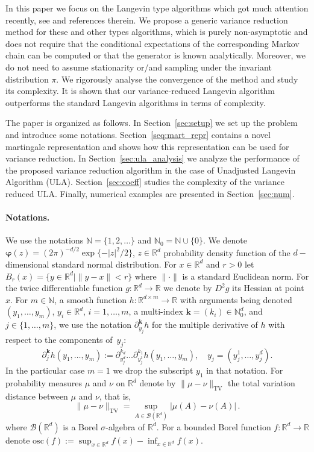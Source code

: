 \documentclass[bj]{imsart}
\def\nset{\mathbb{N}}
\def\rset{\mathbb{R}}
\def\rset{\mathbb{R}}
\newcommand{\tvnorm}[1]{\| #1 \|_{\operatorname{TV}}}
\def\eqsp{\,}
\begin{document}
\par
In this paper we focus on the  Langevin type algorithms which got much attention recently, see \cite{dalalyan2017theoretical,durmus:moulines:2017, MR2353037, MR3861816, MR2977986} and references therein. We propose  a generic variance reduction method for these and other types algorithms, which is purely non-asymptotic and does not require that    the conditional expectations of the corresponding Markov chain can be computed  or that the generator is known analytically. Moreover, we do not need to assume stationarity or/and sampling under the invariant distribution \(\pi.\) We rigorously analyse the convergence of the method and study its complexity. It is shown that  our variance-reduced Langevin algorithm outperforms the standard Langevin algorithms in terms of complexity.
\par
The paper is organized as follows.  In Section~\ref{sec:setup} we set up the problem and introduce some notations. Section~\ref{seq:mart_repr} contains a novel martingale representation and shows how this representation can be used for variance reduction. In Section~\ref{sec:ula_analysis} we analyze the performance of the proposed variance reduction algorithm in the case of Unadjusted Langevin Algorithm (ULA). Section~\ref{sec:coeff} studies the complexity of the variance reduced ULA. Finally, numerical examples are presented in Section~\ref{sec:num}.

\paragraph{Notations. }\label{par:notations}
We use the notations $\nset=\{1,2,\ldots\}$ and $\nset_0=\mathbb N\cup\{0\}$. We denote $\boldsymbol{\varphi}(z)=(2\pi)^{-d/2} \exp\{-|z|^2/2\}$, $z\in\mathbb R^d$ probability density function of the $d-$dimensional standard normal distribution. For $x \in \rset^d$ and $r>0$ let $B_r(x) = \{y \in \rset^d | \|y - x\| < r\}$ where $\|\cdot\|$ is a standard Euclidean norm. For the twice differentiable function $g: \rset^d \rightarrow \rset$ we denote by $D^2g$ its Hessian at point $x$. For $m\in\mathbb N$, a smooth function
$h\colon\mathbb R^{d\times m}\to\mathbb R$
with arguments being denoted
$(y_1,\ldots,y_m)$, $y_i\in\mathbb R^d$, $i=1,\ldots,m$,
a multi-index $\mathbf k=(k_i)\in\mathbb N_0^d$,
and $j\in\{1,\ldots,m\}$,
we use the notation $\partial^{\mathbf k}_{y_j} h$ for the multiple derivative of $h$
with respect to the components of~$y_j$:
\[
\partial^{\mathbf k}_{j} h(y_1,\ldots,y_m)
:=\partial^{k_d}_{y_j^d}
\ldots
\partial^{k_1}_{y_j^1}
h(y_1,\ldots,y_m),
\quad y_j=(y_j^1,\ldots,y_j^d).
\]
In the particular case $m=1$ we drop the subscript $y_1$ in that notation. For probability measures $\mu$ and $\nu$ on $\rset^d$ denote by $\tvnorm{\mu-\nu}$ the total variation distance between $\mu$ and $\nu$, that is,
\[
\tvnorm{\mu-\nu}=\sup_{A \in \mathcal{B}(\rset^d)}
|\mu(A)-\nu(A)| \eqsp.
\]
where $\mathcal{B}(\rset^d)$ is a Borel $\sigma$-algebra of $\rset^d$. For a bounded Borel function $f: \rset^d \rightarrow \rset$ denote $\mathrm{osc}(f):=\sup_{x\in\mathbb R^d}f(x)-\inf_{x\in\mathbb R^d}f(x)$.
\end{document}
